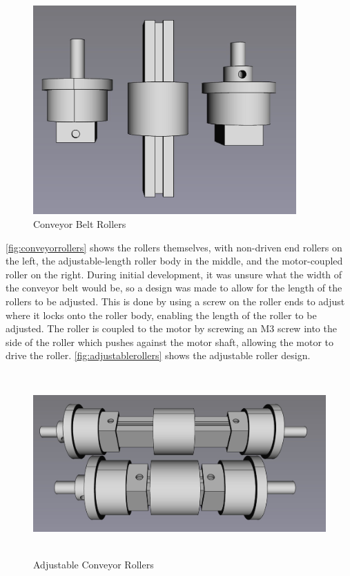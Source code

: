 \begin{figure}[H]
    \begin{minipage}[h]{0.95\textwidth}
        \centering
        \includegraphics[height=8cm]{imgs/freecad/rollers.jpg}
        \caption{Conveyor Belt Rollers}
        \label{fig:conveyorrollers}
    \end{minipage}
\end{figure}

\autoref{fig:conveyorrollers} shows the rollers themselves, with non-driven end rollers on the left, the adjustable-length roller body in the middle, and the motor-coupled roller on the right. During initial development, it was unsure what the width of the conveyor belt would be, so a design was made to allow for the length of the rollers to be adjusted. This is done by using a screw on the roller ends to adjust where it locks onto the roller body, enabling the length of the roller to be adjusted. The roller is coupled to the motor by screwing an M3 screw into the side of the roller which pushes against the motor shaft, allowing the motor to drive the roller. \autoref{fig:adjustablerollers} shows the adjustable roller design.

\begin{figure}[H]
    \begin{minipage}[h]{0.95\textwidth}
        \centering
        \includegraphics[height=7cm]{imgs/freecad/adjustablerollers.jpg}
        \caption{Adjustable Conveyor Rollers}
        \label{fig:adjustablerollers}
    \end{minipage}
\end{figure}

